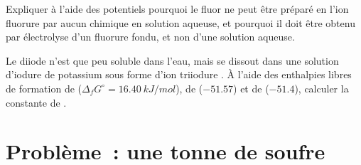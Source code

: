\begin{exercise}[$\star\star\star$]\label{exo:b1:p-block-16-18:11}
Expliquer à l'aide des potentiels pourquoi le fluor ne peut être
préparé en  l'ion fluorure par aucun  chimique en solution
aqueuse, et pourquoi il doit être obtenu par électrolyse d'un fluorure
fondu, et non d'une solution aqueuse.
\end{exercise}

\begin{exercise}[$\star\star\star$]\label{exo:b1:p-block-16-18:12}
Le diiode n'est que peu soluble dans l'eau, mais se dissout dans une
solution d'iodure de potassium sous forme d'ion triiodure . À
l'aide des enthalpies libres de formation de
 ($\Delta_f G^\circ = \qty{16.40}{kJ/mol}$), de 
($-51.57$)
et de  ($-51.4$), calculer la constante de .
\end{exercise}

\section{Problème~: une tonne de soufre}

